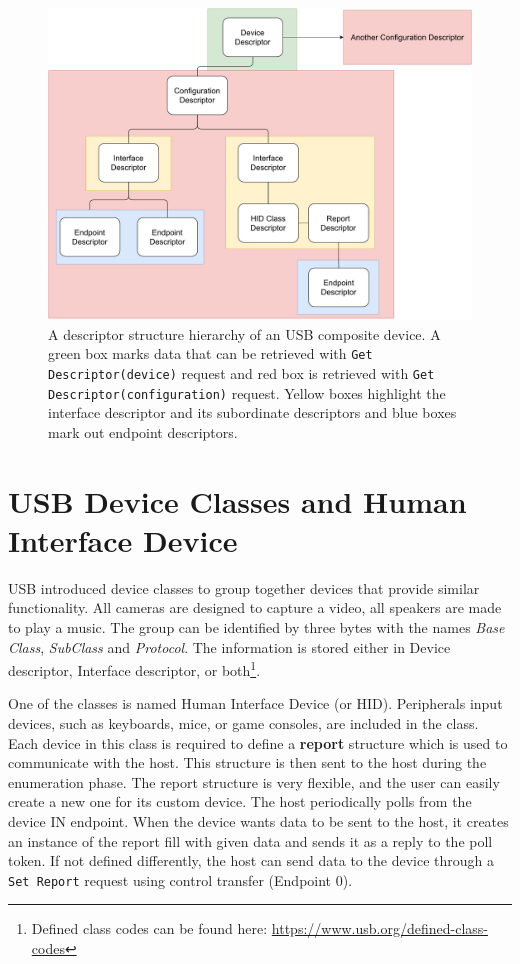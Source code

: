 \begin{figure}[ht]
    \centering
    \includegraphics[width=\linewidth]{./obrazky-figures/descriptor_layout.pdf}
    \caption{A descriptor structure hierarchy of an USB composite device. A green box marks data that can be retrieved with \texttt{Get Descriptor(device)} request and red box is retrieved with \texttt{Get Descriptor(configuration)} request. Yellow boxes highlight the interface descriptor and its subordinate descriptors and blue boxes mark out endpoint descriptors.}
    \label{fig:descriptors}
\end{figure}

\section{USB Device Classes and Human Interface Device}
\label{sec:device_classes_and_hid}
USB introduced device classes to group together devices that provide similar functionality. All cameras are designed to capture a video, all speakers are made to play a music. The group can be identified by three bytes with the names \emph{Base Class}, \emph{SubClass} and \emph{Protocol}. The information is stored either in Device descriptor, Interface descriptor, or both\footnote{Defined class codes can be found here: \url{https://www.usb.org/defined-class-codes}}.

One of the classes is named Human Interface Device (or HID). Peripherals input devices, such as keyboards, mice, or game consoles, are included in the class. Each device in this class is required to define a \textbf{report} structure which is used to communicate with the host. This structure is then sent to the host during the enumeration phase. The report structure is very flexible, and the user can easily create a new one for its custom device. The host periodically polls from the device IN endpoint. When the device wants data to be sent to the host, it creates an instance of the report fill with given data and sends it as a reply to the poll token. If not defined differently, the host can send data to the device through a \verb|Set Report| request using control transfer (Endpoint 0).

